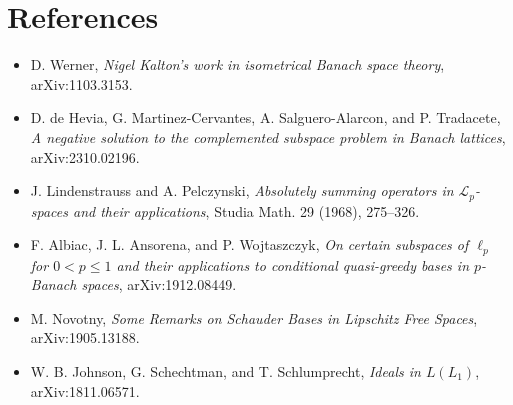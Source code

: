 \documentclass[11pt]{article}
\begin{document}
\section{References}

\begin{itemize}[leftmargin=*]
\item D. Werner, \emph{Nigel Kalton's work in isometrical Banach space
theory}, arXiv:1103.3153.
\item D. de Hevia, G. Martinez-Cervantes, A. Salguero-Alarcon, and
P. Tradacete, \emph{A negative solution to the complemented subspace problem
in Banach lattices}, arXiv:2310.02196.
\item J. Lindenstrauss and A. Pelczynski, \emph{Absolutely summing operators
in \(\mathcal L_p\)-spaces and their applications}, Studia Math. 29 (1968),
275--326.
\item F. Albiac, J. L. Ansorena, and P. Wojtaszczyk, \emph{On certain
subspaces of \(\ell_p\) for \(0<p\le 1\) and their applications to conditional
quasi-greedy bases in \(p\)-Banach spaces}, arXiv:1912.08449.
\item M. Novotny, \emph{Some Remarks on Schauder Bases in Lipschitz Free
Spaces}, arXiv:1905.13188.
\item W. B. Johnson, G. Schechtman, and T. Schlumprecht, \emph{Ideals in
\(L(L_1)\)}, arXiv:1811.06571.
\end{itemize}
\end{document}

